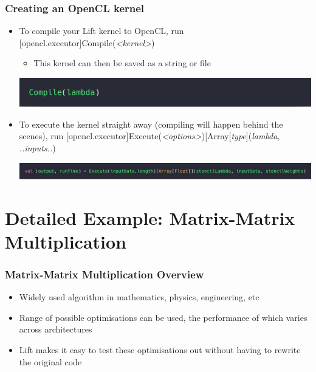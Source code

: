 \documentclass[10pt]{beamer}
\begin{document}
\begin{frame}
\frametitle{Creating an OpenCL kernel}
\begin{itemize}
    \item To compile your Lift kernel to OpenCL, run [opencl.executor]Compile(\textit{<kernel>}) 
        \begin{itemize}
                \item This kernel can then be saved as a string or file
        \end{itemize}
        \vspace{-.7cm}
        \begin{block}{}
        \begin{center}
            \includegraphics[width=.5\textwidth]{../images/simpleCompile.png}
        \end{center}
        \end{block}
    \item To execute the kernel straight away (compiling will happen behind the scenes), run [opencl.executor]Execute(\textit{<options>})[Array[\textit{type}](\textit{lambda}, \textit{..inputs..}) 
    \begin{block}{}
        \begin{center}
            \includegraphics[width=\textwidth]{../images/execute.png}
        \end{center}
    \end{block}
\end{itemize}
\end{frame}


\section{Detailed Example: Matrix-Matrix Multiplication }

\begin{frame}
\frametitle{Matrix-Matrix Multiplication Overview}
\vspace{.2cm}
\begin{itemize}
    \item Widely used algorithm in mathematics, physics, engineering, etc
    \item Range of possible optimisations can be used, the performance of which varies across architectures
    \item Lift makes it easy to test these optimisations out without having to rewrite the original code 

\end{itemize}
\vspace{-1.2cm}
\end{frame}
\end{document}

